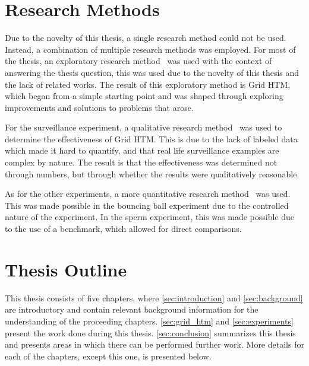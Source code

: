 \section{Research Methods}
Due to the novelty of this thesis, a single research method could not be used. Instead, a combination of multiple research methods was employed. For most of the thesis, an exploratory research method~\cite{exploratory_research} was used with the context of answering the thesis question, this was used due to the novelty of this thesis and the lack of related works. The result of this exploratory method is Grid HTM, which began from a simple starting point and was shaped through exploring improvements and solutions to problems that arose.
\par
For the surveillance experiment, a qualitative research method~\cite{quantitative_qualitative} was used to determine the effectiveness of Grid HTM. This is due to the lack of labeled data which made it hard to quantify, and that real life surveillance examples are complex by nature. The result is that the effectiveness was determined not through numbers, but through whether the results were qualitatively reasonable.
\par
As for the other experiments, a more quantitative research method~\cite{quantitative_qualitative} was used. This was made possible in the bouncing ball experiment due to the controlled nature of the experiment. In the sperm experiment, this was made possible due to the use of a benchmark, which allowed for direct comparisons.
\section{Thesis Outline}
This thesis consists of five chapters, where \autoref{sec:introduction} and \autoref{sec:background} are introductory and contain relevant background information for the understanding of the proceeding chapters. \autoref{sec:grid_htm} and \autoref{sec:experiments} present the work done during this thesis. \autoref{sec:conclusion} summarizes this thesis and presents areas in which there can be performed further work. More details for each of the chapters, except this one, is presented below.
\par

